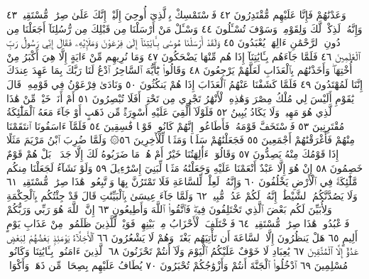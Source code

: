وَعَدْنَٰهُمْ فَإِنَّا عَلَيْهِم مُّقْتَدِرُونَ ٤٢ فَٱسْتَمْسِكْ بِٱلَّذِيٓ أُوحِيَ
إِلَيْكَۖ إِنَّكَ عَلَىٰ صِرَٰطࣲ مُّسْتَقِيمࣲ ٤٣ وَإِنَّهُۥ لَذِكْرࣱ لَّكَ وَلِقَوْمِكَۖ
وَسَوْفَ تُسْـَٔلُونَ ٤٤ وَسْـَٔلْ مَنْ أَرْسَلْنَا مِن قَبْلِكَ مِن رُّسُلِنَآ
أَجَعَلْنَا مِن دُونِ ٱلرَّحْمَٰنِ ءَالِهَةࣰ يُعْبَدُونَ ٤٥ وَلَقَدْ أَرْسَلْنَا
مُوسَىٰ بِـَٔايَٰتِنَآ إِلَىٰ فِرْعَوْنَ وَمَلَإِي۟هِۦ فَقَالَ إِنِّي رَسُولُ رَبِّ
ٱلْعَٰلَمِينَ ٤٦ فَلَمَّا جَآءَهُم بِـَٔايَٰتِنَآ إِذَا هُم مِّنْهَا يَضْحَكُونَ ٤٧
وَمَا نُرِيهِم مِّنْ ءَايَةٍ إِلَّا هِيَ أَكْبَرُ مِنْ أُخْتِهَاۖ وَأَخَذْنَٰهُم
بِٱلْعَذَابِ لَعَلَّهُمْ يَرْجِعُونَ ٤٨ وَقَالُوا۟ يَٰٓأَيُّهَ ٱلسَّاحِرُ ٱدْعُ لَنَا
رَبَّكَ بِمَا عَهِدَ عِندَكَ إِنَّنَا لَمُهْتَدُونَ ٤٩ فَلَمَّا كَشَفْنَا
عَنْهُمُ ٱلْعَذَابَ إِذَا هُمْ يَنكُثُونَ ٥٠ وَنَادَىٰ فِرْعَوْنُ فِي قَوْمِهِۦ
قَالَ يَٰقَوْمِ أَلَيْسَ لِي مُلْكُ مِصْرَ وَهَٰذِهِ ٱلْأَنْهَٰرُ تَجْرِي مِن
تَحْتِيٓۚ أَفَلَا تُبْصِرُونَ ٥١ أَمْ أَنَا۠ خَيْرࣱ مِّنْ هَٰذَا ٱلَّذِي هُوَ مَهِينࣱ
وَلَا يَكَادُ يُبِينُ ٥٢ فَلَوْلَآ أُلْقِيَ عَلَيْهِ أَسْوِرَةࣱ مِّن ذَهَبٍ أَوْ جَآءَ
مَعَهُ ٱلْمَلَٰٓئِكَةُ مُقْتَرِنِينَ ٥٣ فَٱسْتَخَفَّ قَوْمَهُۥ
فَأَطَاعُوهُۚ إِنَّهُمْ كَانُوا۟ قَوْمࣰا فَٰسِقِينَ ٥٤ فَلَمَّآ ءَاسَفُونَا
ٱنتَقَمْنَا مِنْهُمْ فَأَغْرَقْنَٰهُمْ أَجْمَعِينَ ٥٥ فَجَعَلْنَٰهُمْ
سَلَفࣰا وَمَثَلࣰا لِّلْأٓخِرِينَ ٥٦۞ وَلَمَّا ضُرِبَ ٱبْنُ مَرْيَمَ مَثَلًا
إِذَا قَوْمُكَ مِنْهُ يَصِدُّونَ ٥٧ وَقَالُوٓا۟ ءَأَٰلِهَتُنَا خَيْرٌ أَمْ
هُوَۚ مَا ضَرَبُوهُ لَكَ إِلَّا جَدَلَۢاۚ بَلْ هُمْ قَوْمٌ خَصِمُونَ ٥٨ إِنْ هُوَ
إِلَّا عَبْدٌ أَنْعَمْنَا عَلَيْهِ وَجَعَلْنَٰهُ مَثَلࣰا لِّبَنِيٓ إِسْرَٰٓءِيلَ ٥٩
وَلَوْ نَشَآءُ لَجَعَلْنَا مِنكُم مَّلَٰٓئِكَةࣰ فِي ٱلْأَرْضِ يَخْلُفُونَ ٦٠
وَإِنَّهُۥ لَعِلْمࣱ لِّلسَّاعَةِ فَلَا تَمْتَرُنَّ بِهَا وَٱتَّبِعُونِۚ هَٰذَا صِرَٰطࣱ
مُّسْتَقِيمࣱ ٦١ وَلَا يَصُدَّنَّكُمُ ٱلشَّيْطَٰنُۖ إِنَّهُۥ لَكُمْ عَدُوࣱّ مُّبِينࣱ ٦٢
وَلَمَّا جَآءَ عِيسَىٰ بِٱلْبَيِّنَٰتِ قَالَ قَدْ جِئْتُكُم بِٱلْحِكْمَةِ
وَلِأُبَيِّنَ لَكُم بَعْضَ ٱلَّذِي تَخْتَلِفُونَ فِيهِۖ فَٱتَّقُوا۟ ٱللَّهَ وَأَطِيعُونِ ٦٣
إِنَّ ٱللَّهَ هُوَ رَبِّي وَرَبُّكُمْ فَٱعْبُدُوهُۚ هَٰذَا صِرَٰطࣱ مُّسْتَقِيمࣱ ٦٤
فَٱخْتَلَفَ ٱلْأَحْزَابُ مِنۢ بَيْنِهِمْۖ فَوَيْلࣱ لِّلَّذِينَ ظَلَمُوا۟
مِنْ عَذَابِ يَوْمٍ أَلِيمٍ ٦٥ هَلْ يَنظُرُونَ إِلَّا ٱلسَّاعَةَ أَن
تَأْتِيَهُم بَغْتَةࣰ وَهُمْ لَا يَشْعُرُونَ ٦٦ ٱلْأَخِلَّآءُ يَوْمَئِذِۭ
بَعْضُهُمْ لِبَعْضٍ عَدُوٌّ إِلَّا ٱلْمُتَّقِينَ ٦٧ يَٰعِبَادِ لَا خَوْفٌ
عَلَيْكُمُ ٱلْيَوْمَ وَلَآ أَنتُمْ تَحْزَنُونَ ٦٨ ٱلَّذِينَ ءَامَنُوا۟ بِـَٔايَٰتِنَا
وَكَانُوا۟ مُسْلِمِينَ ٦٩ ٱدْخُلُوا۟ ٱلْجَنَّةَ أَنتُمْ وَأَزْوَٰجُكُمْ
تُحْبَرُونَ ٧٠ يُطَافُ عَلَيْهِم بِصِحَافࣲ مِّن ذَهَبࣲ وَأَكْوَابࣲۖ
